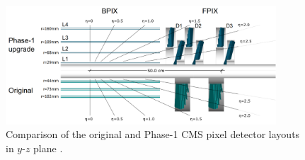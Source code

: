 \begin{figure}
\centering
\includegraphics[width=0.9\textwidth]{figures/lhc_and_cms/pixels_layout_comparison.png}
\caption{Comparison of the original and Phase-1 CMS pixel detector layouts in $y$-$z$ plane \cite{cms_phase1_pixels}.}
\label{pixels_original_vs_phase1}
\end{figure}